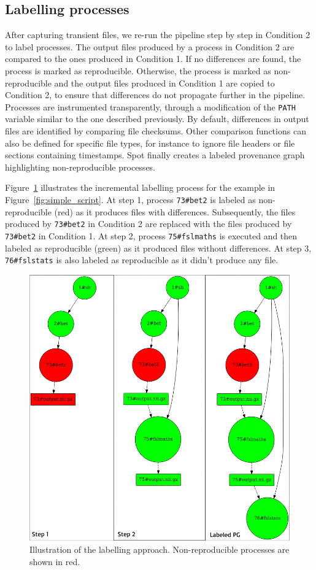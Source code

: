 \documentclass[a4paper,num-refs]{oup-contemporary}
\newcommand{\toolname}[0]{Spot\xspace}
\begin{document}
\subsection{Labelling processes} 

After capturing transient files, we re-run the pipeline
step by step in Condition 2 to label processes. The output files
produced by a process in Condition 2 are compared to the ones produced
in Condition 1. If no differences are found, the process is marked as
reproducible. Otherwise, the process is marked as non-reproducible and the
output files produced in Condition 1 are copied to Condition 2, to ensure
that differences do not propagate further in the pipeline. Processes are
instrumented transparently, through a modification of the \texttt{PATH}
variable similar to the one described previously. By default, differences
in output files are identified by comparing file checksums. Other
comparison functions can also be defined for specific file types, for
instance to ignore file headers or file sections containing timestamps.
\toolname finally creates a labeled
provenance graph highlighting non-reproducible processes.

Figure~\ref{fig:iterations} illustrates the incremental labelling 
process for the example in Figure~\ref{fig:simple_script}. 
At step 1, process \texttt{73\#bet2} is labeled as non-reproducible (red) 
as it produces files with differences. Subsequently, the files produced by \texttt{73\#bet2} in  
Condition 2 are replaced with the files produced by \texttt{73\#bet2} in 
Condition 1.
At step 2, process \texttt{75\#fslmaths} is executed and then labeled 
as reproducible (green) as it produced files without differences.
At step 3, \texttt{76\#fslstats} is also labeled as 
reproducible as it didn't produce any file.

\begin{figure}
  \centering
  \includegraphics[width=.8\columnwidth]{images/labelling-process}
  \caption{Illustration of the labelling approach. Non-reproducible processes are shown in red.}
  \label{fig:iterations}
\end{figure}
\end{document}
